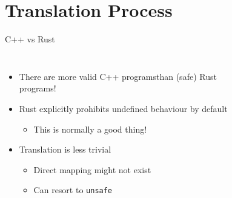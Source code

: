 \documentclass[10pt,aspectratio=169]{beamer}
\begin{document}

\section{Translation Process}

\begin{frame}{C++ vs Rust}
    \begin{columns}[onlytextwidth]
        \centering
            \begin{itemize}
                \item There are more valid C++ programs\newline than (safe) Rust programs!
                \item Rust explicitly prohibits undefined behaviour by default
                \begin{itemize}
                    \item This is normally a good thing!
                \end{itemize}
                \item Translation is less trivial
                \begin{itemize}
                    \item Direct mapping might not exist
                    \item Can resort to \texttt{unsafe} %
                \end{itemize}
            \end{itemize}
            \begin{figure}[H]

\end{figure}
\end{columns}
\end{frame}
\end{document}
